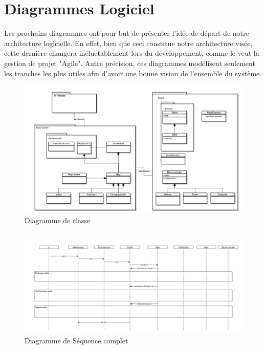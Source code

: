 \chapter{Diagrammes Logiciel}
Les prochains diagrammes ont pour but de présenter l'idée de départ de notre architecture logicielle.
En effet, bien que ceci constitue notre architecture visée, cette dernière changera inéluctablement lors du développement, comme le veut la gestion de projet "Agile".
Autre précision, ces diagrammes modélisent seulement les tranches les plus utiles afin d'avoir une bonne vision de l'ensemble du système.

\begin{figure}
  \centering
  \includegraphics[scale=0.5, angle=90]{resources/diagrams/classDiagram.png}
  \caption{Diagramme de classe}
\end{figure}

\begin{figure}
  \centering
  \includegraphics[scale=0.45, angle=90]{resources/diagrams/sequenceDiagram.png}
  \caption{Diagramme de Séquence complet}
\end{figure}

